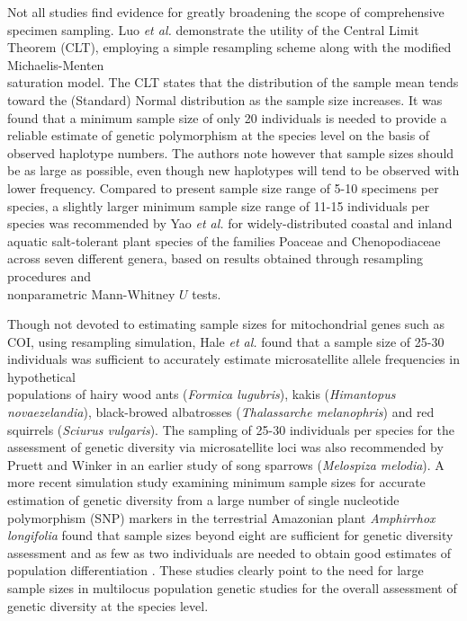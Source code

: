 Not all studies find evidence for greatly broadening the scope of comprehensive \\ specimen sampling. Luo \textit{et al.} \cite{luo2015simulation} demonstrate the utility of the Central Limit Theorem (CLT), employing a simple resampling scheme along with the modified Michaelis-Menten \\ saturation model. The CLT states that the distribution of the sample mean tends toward the (Standard) Normal distribution as the sample size increases. It was found that a minimum sample size of only 20 individuals is needed to provide a reliable estimate of genetic polymorphism at the species level on the basis of observed haplotype numbers. The authors note however that sample sizes should be as large as possible, even though new haplotypes will tend to be observed with lower frequency. Compared to present sample size range of 5-10 specimens per species, a slightly larger minimum sample size range of 11-15 individuals per species was recommended by Yao \textit{et al.} \cite{yao2017evaluating} for widely-distributed coastal and inland aquatic salt-tolerant plant species of the families Poaceae and Chenopodiaceae across seven different genera, based on results obtained through resampling procedures and \\ nonparametric Mann-Whitney $U$ tests.



Though not devoted to estimating sample sizes for mitochondrial genes such as COI, using resampling simulation, Hale \textit{et al.} \cite{hale2012sampling} found that a sample size of 25-30 individuals was sufficient to accurately estimate microsatellite allele frequencies in hypothetical \\ populations of hairy wood ants (\textit{Formica lugubris}), kakis (\textit{Himantopus novaezelandia}), black-browed albatrosses (\textit{Thalassarche melanophris}) and red squirrels (\textit{Sciurus vulgaris}). The sampling of 25-30 individuals per species for the assessment of genetic diversity via microsatellite loci was also recommended by Pruett and Winker \cite{pruett2008effects} in an earlier study of song sparrows (\textit{Melospiza melodia}). A more recent simulation study examining minimum sample sizes for accurate estimation of genetic diversity from a large number of single nucleotide polymorphism (SNP) markers in the terrestrial Amazonian plant \textit{Amphirrhox longifolia} found that sample sizes beyond eight are sufficient for genetic diversity \\ assessment and as few as two individuals are needed to obtain good estimates of population differentiation \cite{nazareno2017minimum}. These studies clearly point to the need for large sample sizes in multilocus population genetic studies for the overall assessment of genetic diversity at the species level.



